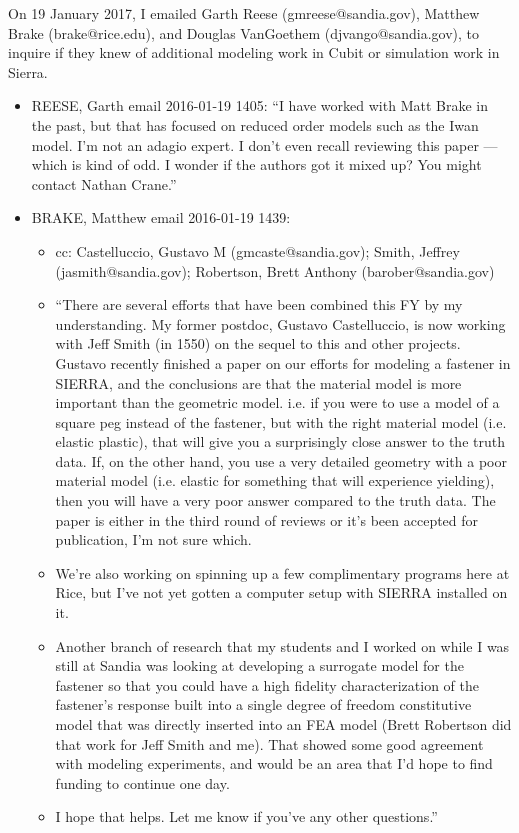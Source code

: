 \documentclass[12pt,reqno]{amsart}
\begin{document}
On 19 January 2017, I emailed Garth Reese (gmreese@sandia.gov), 
Matthew Brake (brake@rice.edu), and Douglas VanGoethem (djvango@sandia.gov), 
to inquire if they knew of additional modeling work in Cubit or 
simulation work in Sierra.  


\begin{itemize}
\item REESE, Garth email 2016-01-19 1405: ``I have worked with Matt 
Brake in the past, but that has focused on reduced order models such 
as the Iwan model. I'm not an adagio expert. I don't even recall reviewing 
this paper --- which is kind of odd. I wonder if the authors got it mixed up? 
You might contact Nathan Crane.''

\item BRAKE, Matthew email 2016-01-19 1439: 
\begin{itemize}
\item cc: Castelluccio, Gustavo M (gmcaste@sandia.gov); Smith, Jeffrey 
(jasmith@sandia.gov); Robertson, Brett Anthony (barober@sandia.gov)
\item ``There are several efforts that have been combined this FY by my
understanding. My former postdoc, Gustavo Castelluccio, is now working with
Jeff Smith (in 1550) on the sequel to this and other projects. Gustavo
recently finished a paper on our efforts for modeling a fastener in SIERRA,
and the conclusions are that the material model is more important than the
geometric model. i.e. if you were to use a model of a square peg instead of
the fastener, but with the right material model (i.e. elastic plastic), that
will give you a surprisingly close answer to the truth data. If, on the
other hand, you use a very detailed geometry with a poor material model
(i.e. elastic for something that will experience yielding), then you will
have a very poor answer compared to the truth data. The paper is either in
the third round of reviews or it's been accepted for publication, I'm not
sure which.
\item We're also working on spinning up a few complimentary programs here at Rice,
but I've not yet gotten a computer setup with SIERRA installed on it.
\item Another branch of research that my students and I worked on while I was
still at Sandia was looking at developing a surrogate model for the fastener
so that you could have a high fidelity characterization of the fastener's
response built into a single degree of freedom constitutive model that was
directly inserted into an FEA model (Brett Robertson did that work for Jeff
Smith and me). That showed some good agreement with modeling experiments,
and would be an area that I'd hope to find funding to continue one day.
\item I hope that helps. Let me know if you've any other questions.''
\end{itemize}
\end{itemize}
\end{document}
